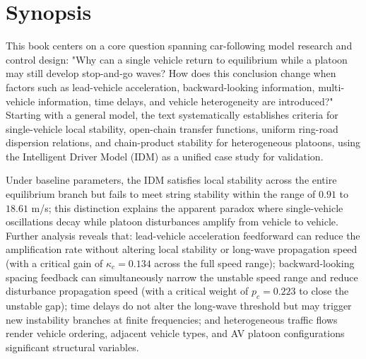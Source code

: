\documentclass[11pt,a4paper,openany]{book}
\numberwithin{equation}{chapter}
\numberwithin{figure}{chapter}
\numberwithin{table}{chapter}
\begin{document}
\chapter*{Synopsis}
This book centers on a core question spanning car-following model research and control design:
"Why can a single vehicle return to equilibrium while a platoon may still develop stop-and-go waves? How does this conclusion change when factors such as lead-vehicle acceleration, backward-looking information, multi-vehicle information, time delays, and vehicle heterogeneity are introduced?"
Starting with a general model, the text systematically establishes criteria for single-vehicle local stability, open-chain transfer functions, uniform ring-road dispersion relations, and chain-product stability for heterogeneous platoons, using the Intelligent Driver Model (IDM) as a unified case study for validation.

Under baseline parameters, the IDM satisfies local stability across the entire equilibrium branch but fails to meet string stability within the range of $0.91$ to $18.61$ m/s; this distinction explains the apparent paradox where single-vehicle oscillations decay while platoon disturbances amplify from vehicle to vehicle. Further analysis reveals that: lead-vehicle acceleration feedforward can reduce the amplification rate without altering local stability or long-wave propagation speed (with a critical gain of $\kappa_c=0.134$ across the full speed range); backward-looking spacing feedback can simultaneously narrow the unstable speed range and reduce disturbance propagation speed (with a critical weight of $p_c=0.223$ to close the unstable gap); time delays do not alter the long-wave threshold but may trigger new instability branches at finite frequencies; and heterogeneous traffic flows render vehicle ordering, adjacent vehicle types, and AV platoon configurations significant structural variables.
\end{document}
